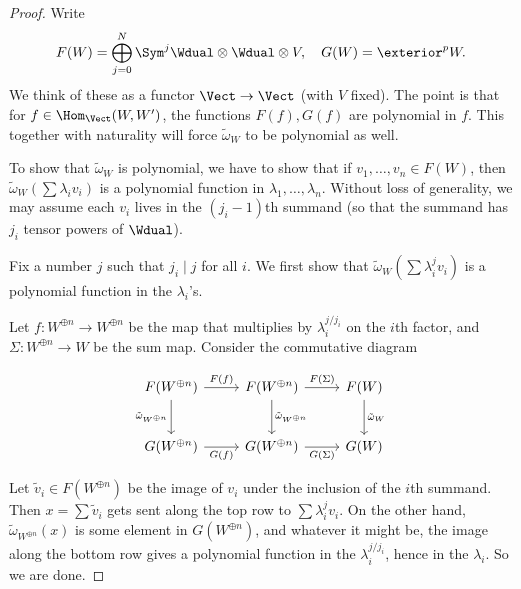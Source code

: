 \begin{proof}
	Write
	\begin{equation*}
		F(W) = \bigoplus_{j = 0}^N \Sym^j \Wdual \otimes \Wdual \otimes V,\quad G(W) = \exterior^p W.
	\end{equation*}
	We think of these as a functor $\Vect \to \Vect$ (with $V$ fixed). The point is that for $f \in \Hom_\Vect(W, W')$, the functions $F(f), G(f)$ are polynomial in $f$. This together with naturality will force $\tilde{\omega}_W$ to be polynomial as well.

	To show that $\tilde{\omega}_W$ is polynomial, we have to show that if $v_1, \ldots, v_n \in F(W)$, then $\tilde{\omega}_W(\sum \lambda_i v_i)$ is a polynomial function in $\lambda_1, \ldots, \lambda_n$. Without loss of generality, we may assume each $v_i$ lives in the $(j_i - 1)$th summand (so that the summand has $j_i$ tensor powers of $\Wdual$).

	Fix a number  $j$ such that $j_i \mid j$ for all $i$. We first show that $\tilde{\omega}_W(\sum \lambda_i^j v_i)$ is a polynomial function in the $\lambda_i$'s.

	Let $f: W^{\oplus n} \to W^{\oplus n}$ be the map that multiplies by $\lambda_i^{j / j_i}$ on the $i$th factor, and $\Sigma: W^{\oplus n} \to W$ be the sum map. Consider the commutative diagram

	\begin{equation*}
		\begin{tikzcd}[sep=2.5em]
			F(W^{\oplus n}) \ar[r, "F(f)"] \ar[d, "\tilde{\omega}_{W^{\oplus n}}"'] & F(W^{\oplus n}) \ar[r, "F(\Sigma)"]\ar[d, "\tilde{\omega}_{W^{\oplus n}}"] & F(W)\ar[d, "\tilde{\omega}_{W}"] \\
			G(W^{\oplus n}) \ar[r, "G(f)"'] & G(W^{\oplus n}) \ar[r, "G(\Sigma)"'] & G(W)
		\end{tikzcd}
	\end{equation*}


	Let $\tilde{v}_i \in F(W^{\oplus n})$ be the image of $v_i$ under the inclusion of the $i$th summand. Then $x = \sum \tilde{v}_i$ gets sent along the top row to $\sum \lambda_i^j v_i$. On the other hand, $\tilde{\omega}_{W^{\oplus n}}(x)$ is some element in $G(W^{\oplus n})$, and whatever it might be, the image along the bottom row gives a polynomial function in the $\lambda_i^{j/j_i}$, hence in the $\lambda_i$. So we are done.


\end{proof}
